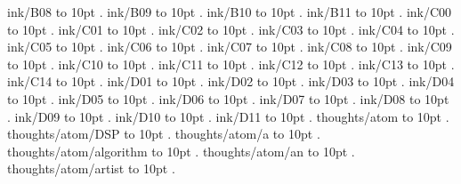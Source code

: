 \smallskip
ink/B08 \leaders\hbox to 10pt {\hss.\hss}  \hfill {}
\smallskip
ink/B09 \leaders\hbox to 10pt {\hss.\hss}  \hfill {}
\smallskip
ink/B10 \leaders\hbox to 10pt {\hss.\hss}  \hfill {}
\smallskip
ink/B11 \leaders\hbox to 10pt {\hss.\hss}  \hfill {}
\smallskip
ink/C00 \leaders\hbox to 10pt {\hss.\hss}  \hfill {}
\smallskip
ink/C01 \leaders\hbox to 10pt {\hss.\hss}  \hfill {}
\smallskip
ink/C02 \leaders\hbox to 10pt {\hss.\hss}  \hfill {}
\smallskip
ink/C03 \leaders\hbox to 10pt {\hss.\hss}  \hfill {}
\smallskip
ink/C04 \leaders\hbox to 10pt {\hss.\hss}  \hfill {}
\smallskip
ink/C05 \leaders\hbox to 10pt {\hss.\hss}  \hfill {}
\smallskip
ink/C06 \leaders\hbox to 10pt {\hss.\hss}  \hfill {}
\smallskip
ink/C07 \leaders\hbox to 10pt {\hss.\hss}  \hfill {}
\smallskip
ink/C08 \leaders\hbox to 10pt {\hss.\hss}  \hfill {}
\smallskip
ink/C09 \leaders\hbox to 10pt {\hss.\hss}  \hfill {}
\smallskip
ink/C10 \leaders\hbox to 10pt {\hss.\hss}  \hfill {}
\smallskip
ink/C11 \leaders\hbox to 10pt {\hss.\hss}  \hfill {}
\smallskip
ink/C12 \leaders\hbox to 10pt {\hss.\hss}  \hfill {}
\smallskip
ink/C13 \leaders\hbox to 10pt {\hss.\hss}  \hfill {}
\smallskip
ink/C14 \leaders\hbox to 10pt {\hss.\hss}  \hfill {}
\smallskip
ink/D01 \leaders\hbox to 10pt {\hss.\hss}  \hfill {}
\smallskip
ink/D02 \leaders\hbox to 10pt {\hss.\hss}  \hfill {}
\smallskip
ink/D03 \leaders\hbox to 10pt {\hss.\hss}  \hfill {}
\smallskip
ink/D04 \leaders\hbox to 10pt {\hss.\hss}  \hfill {}
\smallskip
ink/D05 \leaders\hbox to 10pt {\hss.\hss}  \hfill {}
\smallskip
ink/D06 \leaders\hbox to 10pt {\hss.\hss}  \hfill {}
\smallskip
ink/D07 \leaders\hbox to 10pt {\hss.\hss}  \hfill {}
\smallskip
ink/D08 \leaders\hbox to 10pt {\hss.\hss}  \hfill {}
\smallskip
ink/D09 \leaders\hbox to 10pt {\hss.\hss}  \hfill {}
\smallskip
ink/D10 \leaders\hbox to 10pt {\hss.\hss}  \hfill {}
\smallskip
ink/D11 \leaders\hbox to 10pt {\hss.\hss}  \hfill {}
\smallskip
thoughts/atom \leaders\hbox to 10pt {\hss.\hss}  \hfill {}
\smallskip
thoughts/atom/DSP \leaders\hbox to 10pt {\hss.\hss}  \hfill {}
\smallskip
thoughts/atom/a \leaders\hbox to 10pt {\hss.\hss}  \hfill {}
\smallskip
thoughts/atom/algorithm \leaders\hbox to 10pt {\hss.\hss}  \hfill {}
\smallskip
thoughts/atom/an \leaders\hbox to 10pt {\hss.\hss}  \hfill {}
\smallskip
thoughts/atom/artist \leaders\hbox to 10pt {\hss.\hss}  \hfill {}
